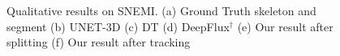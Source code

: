 \begin{figure}[t]
\begin{subfigure}[c]{0.15\textwidth}
		\caption{\label{fig:final_results_f}}
	\end{subfigure}
	\hfill\null
	\caption{Qualitative results on SNEMI. (a) Ground Truth skeleton and segment (b) UNET-3D \cite{cciccek20163d} (c) DT \cite{wang2019deep} (d) DeepFlux$^{\dagger}$ \cite{Wang2019} (e) Our result after splitting (f) Our result after tracking }
	\label{fig:final_results}
\end{figure}

